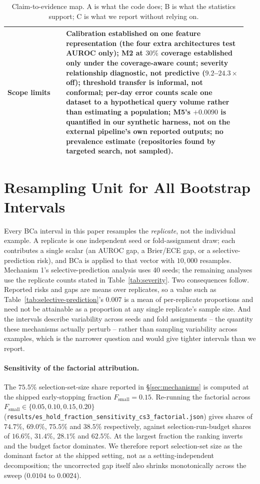 \documentclass{article}
\begin{document}
\begin{table}[h]
{\begin{tabular}{@{}p{0.235\linewidth}p{0.715\linewidth}@{}}
Scope limits & Calibration established on one feature representation (the four
  extra architectures test AUROC only); M2 at $30\%$ coverage established only
  under the coverage-aware count; severity relationship diagnostic, not predictive
  ($9.2$--$24.3\times$ off); threshold transfer is informal, not conformal;
  per-day error counts scale one dataset to a hypothetical query volume rather
  than estimating a population; M5's $+0.0090$ is quantified in our synthetic
  harness, not on the external pipeline's own reported outputs;
  no prevalence estimate (repositories found by targeted search, not sampled). \\
\bottomrule
\end{tabular}}
\caption{Claim-to-evidence map. A is what the code does; B is what the
statistics support; C is what we report without relying on.}
\label{tab:claim-tiers}
\end{table}

\section{Resampling Unit for All Bootstrap Intervals}
\label{app:resampling}
Every BCa interval in this paper resamples the \emph{replicate}, not the
individual example. A replicate is one independent seed or fold-assignment
draw; each contributes a single scalar (an AUROC gap, a Brier/ECE gap, or a
selective-prediction risk), and BCa is applied to that vector with
$10{,}000$ resamples. Mechanism 1's selective-prediction analysis uses 40
seeds; the remaining analyses use the replicate counts stated in
Table~\ref{tab:severity}. Two consequences follow. Reported risks and gaps
are means over replicates, so a value such as
Table~\ref{tab:selective-prediction}'s $0.007$ is a mean of per-replicate
proportions and need not be attainable as a proportion at any single
replicate's sample size. And the intervals describe variability across
seeds and fold assignments -- the quantity these mechanisms actually
perturb -- rather than sampling variability across examples, which is the
narrower question and would give tighter intervals than we report.

\paragraph{Sensitivity of the factorial attribution.} The $75.5\%$
selection-set-size share reported in \S\ref{sec:mechanisms} is computed at
the shipped early-stopping fraction $F_{\text{small}}{=}0.15$. Re-running the
factorial across $F_{\text{small}}\in\{0.05,0.10,0.15,0.20\}$
(\texttt{results/es\_hold\_fraction\_sensitivity\_cs3\_factorial.json}) gives
shares of $74.7\%$, $69.0\%$, $75.5\%$ and $38.5\%$ respectively, against
selection-run-budget shares of $16.6\%$, $31.4\%$, $28.1\%$ and $62.5\%$. At
the largest fraction the ranking inverts and the budget factor dominates. We
therefore report selection-set size as the dominant factor at the shipped
setting, not as a setting-independent decomposition; the uncorrected gap
itself also shrinks monotonically across the sweep ($0.0104$ to $0.0024$).
\end{document}
